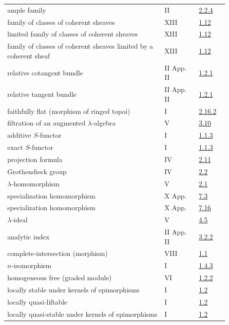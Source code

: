 \begin{longtable}{@{}>{\raggedright\arraybackslash}p{0.64\linewidth}>{\raggedright\arraybackslash}p{0.14\linewidth}>{\raggedright\arraybackslash}p{0.12\linewidth}@{}}
ample family & II & \hyperlink{sga6.e02.def.2-2-4}{2.2.4}\\
family of classes of coherent sheaves & XIII & \hyperlink{sga6.e13.para.1-12}{1.12}\\
limited family of classes of coherent sheaves & XIII & \hyperlink{sga6.e13.para.1-12}{1.12}\\
family of classes of coherent sheaves limited by a coherent sheaf & XIII & \hyperlink{sga6.e13.para.1-12}{1.12}\\
relative cotangent bundle & II App. II & \hyperlink{sga6.e02.para.1-2-1}{1.2.1}\\
relative tangent bundle & II App. II & \hyperlink{sga6.e02.para.1-2-1}{1.2.1}\\
faithfully flat (morphism of ringed topoi) & I & \hyperlink{sga6.e01.exercise.2-16-2}{2.16.2}\\
filtration of an augmented \(\lambda\)-algebra & V & \hyperlink{sga6.e05.para.3-10}{3.10}\\
additive \(S\)-functor & I & \hyperlink{sga6.e01.para.1-1-3}{1.1.3}\\
exact \(S\)-functor & I & \hyperlink{sga6.e01.para.1-1-3}{1.1.3}\\
projection formula & IV & \hyperlink{sga6.e04.para.2-11}{2.11}\\
Grothendieck group & IV & \hyperlink{sga6.e04.def.2-2}{2.2}\\
\(\lambda\)-homomorphism & V & \hyperlink{sga6.e05.def.2-1}{2.1}\\
specialization homomorphism & X App. & \hyperlink{sga6.e10.prop.7-3}{7.3}\\
specialization homomorphism & X App. & \hyperlink{sga6.e10.sec.7.16}{7.16}\\
\(\lambda\)-ideal & V & \hyperlink{sga6.e05.def.4-5}{4.5}\\
analytic index & II App. II & \hyperlink{sga6.e02.para.3-2-2}{3.2.2}\\
complete-intersection (morphism) & VIII & \hyperlink{sga6.e08.def.1-1}{1.1}\\
\(n\)-isomorphism & I & \hyperlink{sga6.e01.def.1-4-3}{1.4.3}\\
homogeneous free (graded module) & VI & \hyperlink{sga6.e06.eq.1-2-2}{1.2.2}\\
locally stable under kernels of epimorphisms & I & \hyperlink{sga6.e01.sec.1.2}{1.2}\\
locally quasi-liftable & I & \hyperlink{sga6.e01.sec.1.2}{1.2}\\
locally quasi-stable under kernels of epimorphisms & I & \hyperlink{sga6.e01.sec.1.2}{1.2}\\

\end{longtable}
